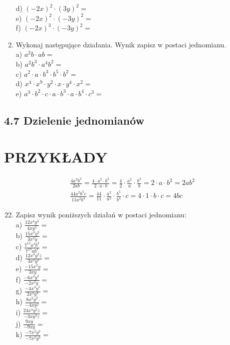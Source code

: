 \documentclass[10pt]{article}
\begin{document}
\begin{enumerate}
d) \((-2 x)^{2} \cdot(3 y)^{2}=\)\\
e) \((-2 x)^{2} \cdot(-3 y)^{2}=\)\\
f) \((-2 x)^{3} \cdot(-3 y)^{2}=\)
  \item Wykonaj następujące działania. Wynik zapisz w postaci jednomianu.\\
a) \(a^{2} b \cdot a b=\)\\
b) \(a^{2} b^{3} \cdot a^{4} b^{2}=\)\\
c) \(a^{2} \cdot a \cdot b^{3} \cdot b^{5} \cdot b^{2}=\)\\
d) \(x^{4} \cdot x^{9} \cdot y^{2} \cdot x \cdot y^{4} \cdot x^{2}=\)\\
e) \(a^{3} \cdot b^{2} \cdot c \cdot a \cdot b^{3} \cdot a \cdot b^{4} \cdot c^{3}=\)
\end{enumerate}

\subsection*{4.7 Dzielenie jednomianów}
\section*{PRZYKŁADY}
\[
\begin{aligned}
& \frac{4 a^{2} b^{3}}{2 a b}=\frac{4 \cdot a^{2} \cdot b^{3}}{2 \cdot a \cdot b}=\frac{4}{2} \cdot \frac{a^{2}}{a} \cdot \frac{b^{3}}{b}=2 \cdot a \cdot b^{2}=2 a b^{2} \\
& \frac{44 a^{2} b^{5} c}{11 a^{2} b^{4}}=\frac{44}{11} \cdot \frac{a^{2}}{a^{2}} \cdot \frac{b^{5}}{b^{4}} \cdot c=4 \cdot 1 \cdot b \cdot c=4 b c
\end{aligned}
\]

\begin{enumerate}
  \setcounter{enumi}{21}
  \item Zapisz wynik poniższych działań w postaci jednomianu:\\
a) \(\frac{12 x^{4} y^{3}}{4 x y^{2}}=\)\\
b) \(\frac{15 x^{3} y^{3}}{3 x^{2} y}=\)\\
c) \(\frac{7^{12} a^{4} b^{3}}{7^{10} a b^{2}}=\)\\
d) \(\frac{12 x^{4} y^{2} z}{3 x^{2} y^{2}}=\)\\
e) \(\frac{-15 x^{2} y}{3 x y}=\)\\
f) \(\frac{-6 x^{4} y^{2}}{-2 x^{2} y}=\)\\
g) \(\frac{-4 x^{4} y^{5}}{2 x^{2} y^{4}}=\)\\
h) \(\frac{8 x^{2} y^{2}}{-4 x y^{2}}=\)\\
i) \(\frac{24 x^{4} y^{2} z}{-3 x y^{2} z}=\)\\
j) \(\frac{9 x y}{-9 x y}=\)\\
k) \(\frac{-7 x^{2} y^{3}}{-7 x^{2} y^{3}}=\)
\end{enumerate}
\end{document}
